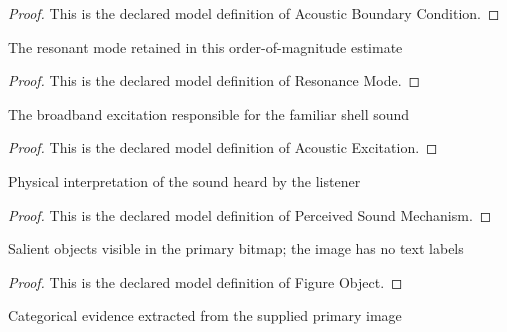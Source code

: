 \begin{proof}
  This is the declared model definition of Acoustic Boundary Condition.
\end{proof}
\begin{definition}
  \label{def:physics:phyx-mini-0217:phyxminiproblems-problemphyxmini0217-resonancemode}
  The resonant mode retained in this order-of-magnitude estimate
\end{definition}
\begin{proof}
  This is the declared model definition of Resonance Mode.
\end{proof}
\begin{definition}
  \label{def:physics:phyx-mini-0217:phyxminiproblems-problemphyxmini0217-acousticexcitation}
  The broadband excitation responsible for the familiar shell sound
\end{definition}
\begin{proof}
  This is the declared model definition of Acoustic Excitation.
\end{proof}
\begin{definition}
  \label{def:physics:phyx-mini-0217:phyxminiproblems-problemphyxmini0217-perceivedsoundmechanism}
  Physical interpretation of the sound heard by the listener
\end{definition}
\begin{proof}
  This is the declared model definition of Perceived Sound Mechanism.
\end{proof}
\begin{definition}
  \label{def:physics:phyx-mini-0217:phyxminiproblems-problemphyxmini0217-figureobject}
  Salient objects visible in the primary bitmap; the image has no text labels
\end{definition}
\begin{proof}
  This is the declared model definition of Figure Object.
\end{proof}
\begin{definition}
  \label{def:physics:phyx-mini-0217:phyxminiproblems-problemphyxmini0217-seashellfigure}
  Categorical evidence extracted from the supplied primary image
\end{definition}
